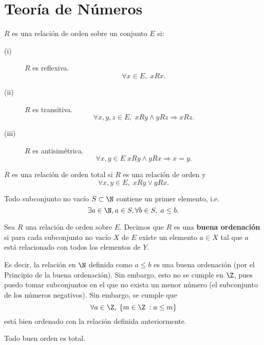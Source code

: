 \chapter{Teoría de Números}
\begin{fdefinition}[]
	\normalfont $\displaystyle R $ es una relación de orden sobre un conjunto $\displaystyle E $ si:
	\begin{description}
	\item[(i)] $\displaystyle R $ es reflexiva. 
		\[\forall x \in E, \; x R x .\]
	\item[(ii)] $\displaystyle R $ es transitiva. 
		\[\forall x,y,z \in E, \; x R y \land y R z \Rightarrow x R z .\]
	\item[(iii)] $\displaystyle R $ es antisimétrica. 
		\[\forall x,y \in E \; xRy \land y Rx \Rightarrow x = y .\]
	\end{description}
\end{fdefinition}

\begin{fdefinition}[]
\normalfont $\displaystyle R $ es una relación de orden total si $\displaystyle R $ es una relación de orden y
\[\forall x,y \in E, \; xRy \lor yRx .\]
\end{fdefinition}

\begin{ftheorem}
\normalfont Todo subconjunto no vacío $\displaystyle S \subset \N $ contiene un primer elemento, i.e. 
\[\exists a\in \N, a \in S, \forall b \in S, \; a \leq b.\]
\end{ftheorem}

\begin{fdefinition}[]
\normalfont Sea $\displaystyle  R $ una relación de orden sobre $\displaystyle  E $. Decimos que $\displaystyle  R $ es una \textbf{buena ordenación} si para cada subconjunto no vacío $\displaystyle X $ de $\displaystyle E $ existe un elemento $\displaystyle a\in X $ tal que $\displaystyle a $ está relacionado con todos los elementos de $\displaystyle Y $. 
\end{fdefinition}
Es decir, la relación en $\displaystyle \N $ definida como $\displaystyle a \leq b $ es una buena ordenación (por el Principio de la buena ordenación). Sin embargo, esto no se cumple en $\displaystyle \Z $, pues puedo tomar subconjuntos en el que no exista un menor número (el subconjunto de los números negativos). Sin embargo, se cumple que
\[\forall a \in \Z, \; \left\{ m \in \Z\; : a \leq m\right\}  \]
está bien ordenado con la relación definida anteriormente.
\begin{ftheorem}[]
\normalfont Todo buen orden es total.
\end{ftheorem}

